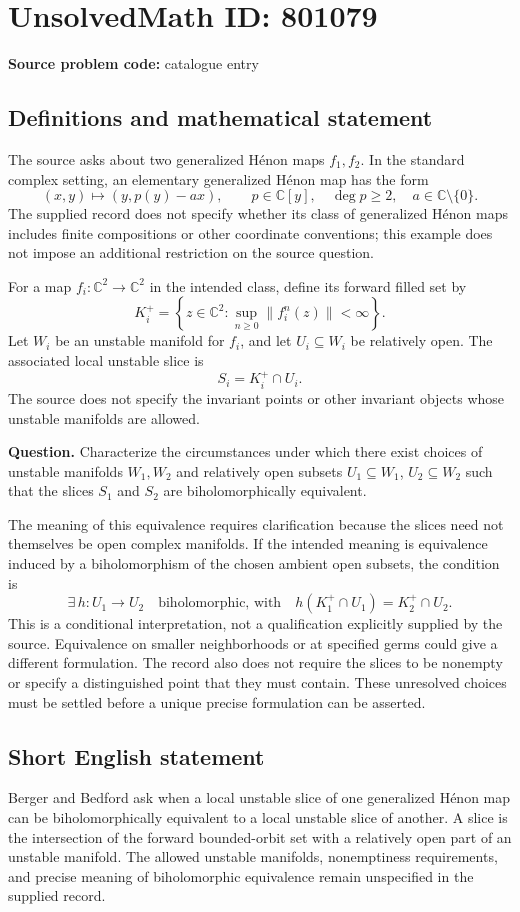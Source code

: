 \documentclass[11pt]{article}
\newcommand{\C}{\mathbb{C}}
\begin{document}
\section*{UnsolvedMath ID: 801079}
\textbf{Source problem code:} catalogue entry
\subsection{Definitions and mathematical statement}
The source asks about two generalized H\'enon maps \(f_1,f_2\). In the standard complex setting, an elementary generalized H\'enon map has the form
\[
(x,y)\longmapsto (y,p(y)-ax),\qquad p\in\C[y],\quad \deg p\geq 2,\quad a\in\C\setminus\{0\}.
\]
The supplied record does not specify whether its class of generalized H\'enon maps includes finite compositions or other coordinate conventions; this example does not impose an additional restriction on the source question.

For a map \(f_i\colon\C^2\to\C^2\) in the intended class, define its forward filled set by
\[
K_i^+=\left\{z\in\C^2:\sup_{n\geq 0}\|f_i^n(z)\|<\infty\right\}.
\]
Let \(W_i\) be an unstable manifold for \(f_i\), and let \(U_i\subseteq W_i\) be relatively open. The associated local unstable slice is
\[
S_i=K_i^+\cap U_i.
\]
The source does not specify the invariant points or other invariant objects whose unstable manifolds are allowed.

\textbf{Question.} Characterize the circumstances under which there exist choices of unstable manifolds \(W_1,W_2\) and relatively open subsets \(U_1\subseteq W_1\), \(U_2\subseteq W_2\) such that the slices \(S_1\) and \(S_2\) are biholomorphically equivalent.

The meaning of this equivalence requires clarification because the slices need not themselves be open complex manifolds. If the intended meaning is equivalence induced by a biholomorphism of the chosen ambient open subsets, the condition is
\[
\exists\,h\colon U_1\longrightarrow U_2
\quad\text{biholomorphic, with}\quad
h(K_1^+\cap U_1)=K_2^+\cap U_2.
\]
This is a conditional interpretation, not a qualification explicitly supplied by the source. Equivalence on smaller neighborhoods or at specified germs could give a different formulation. The record also does not require the slices to be nonempty or specify a distinguished point that they must contain. These unresolved choices must be settled before a unique precise formulation can be asserted.
\subsection{Short English statement}
Berger and Bedford ask when a local unstable slice of one generalized H\'enon map can be biholomorphically equivalent to a local unstable slice of another. A slice is the intersection of the forward bounded-orbit set with a relatively open part of an unstable manifold. The allowed unstable manifolds, nonemptiness requirements, and precise meaning of biholomorphic equivalence remain unspecified in the supplied record.
\end{document}
